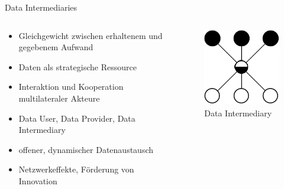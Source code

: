 \begin{frame}{Data Intermediaries \footnotesize\cite{mollerIndustrialDataEcosystems2024}}
    \begin{columns}
        \begin{column}{0.6\textwidth}
            \begin{itemize}
                \item Gleichgewicht zwischen erhaltenem und gegebenem Aufwand
                \item Daten als strategische Ressource
                
                
                \item<2-> Interaktion und Kooperation \alert{multilateraler} Akteure
                \item<2-> Data User, Data Provider, Data Intermediary
                
                \item<3-> offener, dynamischer Datenaustausch
                \item<3-> Netzwerkeffekte, Förderung von Innovation
            \end{itemize}
        \end{column}
        
        \begin{column}{0.4\textwidth}
            \begin{figure}
                \centering
                \includegraphics[height=0.5\textheight]{./assets/industrial_de_architecture.drawio.pdf}
                \caption{Data Intermediary}
            \end{figure}
        \end{column}
    \end{columns}
\end{frame}



